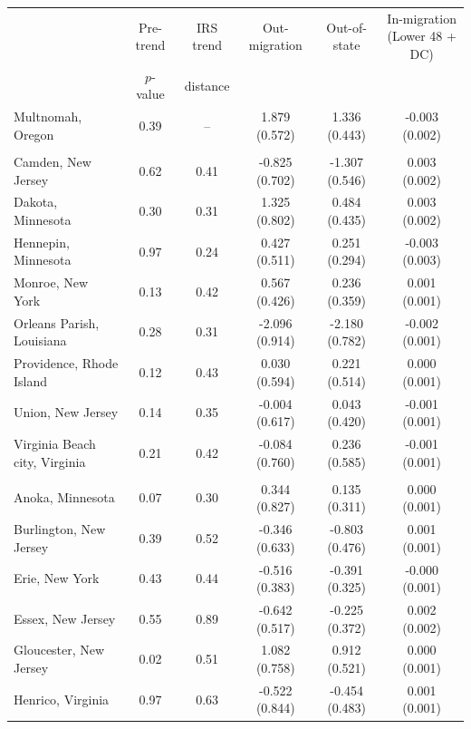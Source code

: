 \begin{tabular*}{\textwidth}{@{\extracolsep{\fill}}lccccc@{}}
\toprule
 & Pre-trend & IRS trend & \shortstack{Out-\\migration} & \shortstack{Out-of-\\state} & \shortstack{In-migration\\(Lower 48 + DC)} \\
 & $p$-value & distance & & & \\
\midrule
Multnomah, Oregon & 0.39 & -- & 1.879 (0.572) & 1.336 (0.443) & -0.003 (0.002) \\
\addlinespace
\multicolumn{6}{l}{\textit{Placebo counties passing both screens}}\\[0.3em]
Camden, New Jersey & 0.62 & 0.41 & -0.825 (0.702) & -1.307 (0.546) & 0.003 (0.002) \\
Dakota, Minnesota & 0.30 & 0.31 & 1.325 (0.802) & 0.484 (0.435) & 0.003 (0.002) \\
Hennepin, Minnesota & 0.97 & 0.24 & 0.427 (0.511) & 0.251 (0.294) & -0.003 (0.003) \\
Monroe, New York & 0.13 & 0.42 & 0.567 (0.426) & 0.236 (0.359) & 0.001 (0.001) \\
Orleans Parish, Louisiana & 0.28 & 0.31 & -2.096 (0.914) & -2.180 (0.782) & -0.002 (0.001) \\
Providence, Rhode Island & 0.12 & 0.43 & 0.030 (0.594) & 0.221 (0.514) & 0.000 (0.001) \\
Union, New Jersey & 0.14 & 0.35 & -0.004 (0.617) & 0.043 (0.420) & -0.001 (0.001) \\
Virginia Beach city, Virginia & 0.21 & 0.42 & -0.084 (0.760) & 0.236 (0.585) & -0.001 (0.001) \\
\addlinespace
\multicolumn{6}{l}{\textit{Counties failing a screen}}\\[0.3em]
Anoka, Minnesota & 0.07 & 0.30 & 0.344 (0.827) & 0.135 (0.311) & 0.000 (0.001) \\
Burlington, New Jersey & 0.39 & 0.52 & -0.346 (0.633) & -0.803 (0.476) & 0.001 (0.001) \\
Erie, New York & 0.43 & 0.44 & -0.516 (0.383) & -0.391 (0.325) & -0.000 (0.001) \\
Essex, New Jersey & 0.55 & 0.89 & -0.642 (0.517) & -0.225 (0.372) & 0.002 (0.002) \\
Gloucester, New Jersey & 0.02 & 0.51 & 1.082 (0.758) & 0.912 (0.521) & 0.000 (0.001) \\
Henrico, Virginia & 0.97 & 0.63 & -0.522 (0.844) & -0.454 (0.483) & 0.001 (0.001) \\

\end{tabular*}
